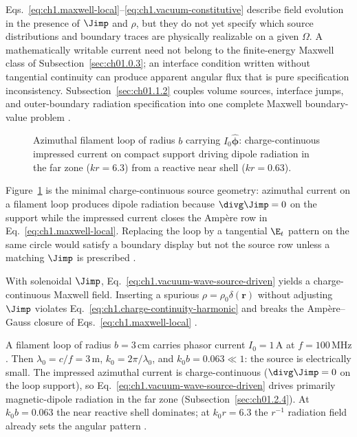

Eqs.~\eqref{eq:ch1.maxwell-local}--\eqref{eq:ch1.vacuum-constitutive} describe
field evolution in the presence of \(\Jimp\) and \(\rho\), but they do not yet
specify which source distributions and boundary traces are physically realizable
on a given \(\Omega\). A mathematically writable current need not belong to the
finite-energy Maxwell class of Subsection~\ref{sec:ch01.0.3}; an interface condition written
without tangential continuity can produce apparent angular flux that is pure specification
inconsistency. Subsection~\ref{sec:ch01.1.2} couples volume
sources, interface jumps, and outer-boundary radiation specification into one complete Maxwell boundary-value problem \cite{stratton1941}.

\begin{figure}[t]
\centering
\VolIPhysFig{\VolIPhysDipoleLoop}
\caption{Azimuthal filament loop of radius $b$ carrying $I_0\hat{\boldsymbol{\phi}}$: charge-continuous impressed current on compact support driving dipole radiation in the far zone ($kr=6.3$) from a reactive near shell ($kr=0.63$).}
\label{fig:ch1.wp-solenoidal-loop}
\end{figure}

Figure~\ref{fig:ch1.wp-solenoidal-loop} is the minimal charge-continuous source geometry: azimuthal
current on a filament loop produces dipole radiation because $\divg\Jimp=0$ on the support while
the impressed current closes the Amp\`ere row in Eq.~\eqref{eq:ch1.maxwell-local}. Replacing the
loop by a tangential $\E_t$ pattern on the same circle would satisfy a boundary display but not
the source row unless a matching $\Jimp$ is prescribed \cite{stratton1941,harrington2001}.

With solenoidal \(\Jimp\), Eq.~\eqref{eq:ch1.vacuum-wave-source-driven} yields a charge-continuous Maxwell field. Inserting a spurious \(\rho=\rho_0\delta(\mathbf{r})\) without adjusting \(\Jimp\) violates Eq.~\eqref{eq:ch1.charge-continuity-harmonic} and breaks the Amp\`ere--Gauss closure of Eqs.~\eqref{eq:ch1.maxwell-local} \cite{maxwell1873,stratton1941}.

\begin{example}
\label{ex:ch1.filament-loop}
A filament loop of radius \(b=3\,\mathrm{cm}\) carries phasor current \(I_0=1\,\mathrm{A}\) at \(f=100\,\mathrm{MHz}\). Then \(\lambda_0=c/f=3\,\mathrm{m}\), \(k_0=2\pi/\lambda_0\), and \(k_0 b=0.063\ll1\): the source is electrically small. The impressed azimuthal current is charge-continuous (\(\divg\Jimp=0\) on the loop support), so Eq.~\eqref{eq:ch1.vacuum-wave-source-driven} drives primarily magnetic-dipole radiation in the far zone (Subsection~\ref{sec:ch01.2.4}). At \(k_0 b=0.063\) the near reactive shell dominates; at \(k_0 r=6.3\) the \(r^{-1}\) radiation field already sets the angular pattern \cite{stratton1941,harrington2001}.
\end{example}

